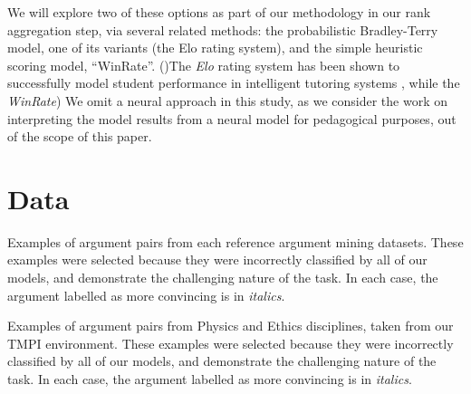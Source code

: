 \documentclass[notitlepage,12pt]{jedm}
\begin{document}
We will explore two of these options as part of our methodology in our rank 
aggregation step, via several related methods: the probabilistic Bradley-Terry 
model, one of its variants (the Elo rating system), and the simple heuristic 
scoring model, ``WinRate''.
()The \textit{Elo} rating system has been shown to successfully model student 
performance in intelligent tutoring systems \cite{pelanek_applications_2016}, 
while the \textit{WinRate})
We omit a neural approach in this study, as we consider the work on 
interpreting the model results from a neural model for pedagogical purposes, 
out of the scope of this paper.



\section{Data}\label{sec:datasets}

\begin{table}
	\caption{
		Examples of argument pairs from each reference argument mining 
		datasets. 
		These examples were selected because they were incorrectly classified 
		by all of our models, and demonstrate the challenging nature of the 
		task. 
		In each case, the argument labelled as more convincing is in 
		\textit{italics}.
	}
	\label{tab:sample_obs}
	\begin{subtable}[t]{\textwidth}
		
	\end{subtable}
	\begin{subtable}[t]{\textwidth}
		
	\end{subtable}
\end{table}

\begin{table}
	\caption{
		Examples of argument pairs from Physics and Ethics disciplines, taken 
		from our TMPI environment. 
		These examples were selected because they were incorrectly classified 
		by all of our models, and demonstrate the challenging nature of the 
		task. 
		In each case, the argument labelled as more convincing is in 
		\textit{italics}.}
	\label{tab:sample_obs_dalite}
	\begin{subtable}[t]{\textwidth}
		
	\end{subtable}
	\begin{subtable}[t]{\textwidth}
	
	\end{subtable}
\end{table}
\end{document}

